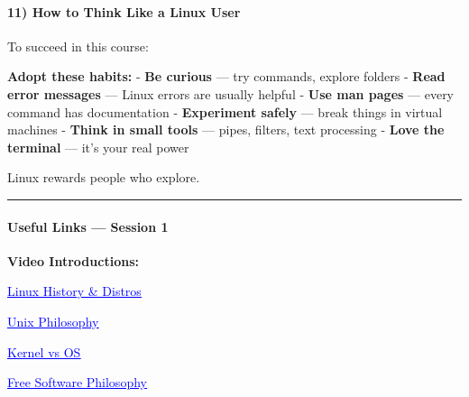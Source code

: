 \documentclass[
  english,
  paper=a4,
  oneside  ,captions=tableheading
]{scrartcl}
\begin{document}
\paragraph{11) How to Think Like a Linux
User}\label{how-to-think-like-a-linux-user}

To succeed in this course:

\textbf{Adopt these habits:} - \textbf{Be curious} --- try commands,
explore folders - \textbf{Read error messages} --- Linux errors are
usually helpful - \textbf{Use man pages} --- every command has
documentation - \textbf{Experiment safely} --- break things in virtual
machines - \textbf{Think in small tools} --- pipes, filters, text
processing - \textbf{Love the terminal} --- it's your real power

Linux rewards people who explore.

\begin{center}\rule{0.5\linewidth}{0.5pt}\end{center}

\paragraph{Useful Links --- Session 1}\label{useful-links-session-1}

\textbf{Video Introductions:}

%
  \par\vspace{0.5ex}%
  \href{https://www.youtube.com/watch?v=ShcR4Zfc6Dw}{\textcolor{blue}{\underline{\faLink\quad Linux History \& Distros}}}%
  \par\vspace{0.5ex}%

%
  \par\vspace{0.5ex}%
  \href{https://youtu.be/gojeTqXdBH0?si=kg-iP4KEFjLU-Tto}{\textcolor{blue}{\underline{\faLink\quad Unix Philosophy}}}%
  \par\vspace{0.5ex}%

%
  \par\vspace{0.5ex}%
  \href{https://youtu.be/IvGdY6luTtU?si=nEcir9iqjmYMa1lo}{\textcolor{blue}{\underline{\faLink\quad Kernel vs OS}}}%
  \par\vspace{0.5ex}%

%
  \par\vspace{0.5ex}%
  \href{https://youtu.be/Ag1AKIl_2GM?si=0YDnS2BDSrAAmFX8}{\textcolor{blue}{\underline{\faLink\quad Free Software Philosophy}}}%
  \par\vspace{0.5ex}%
\end{document}
